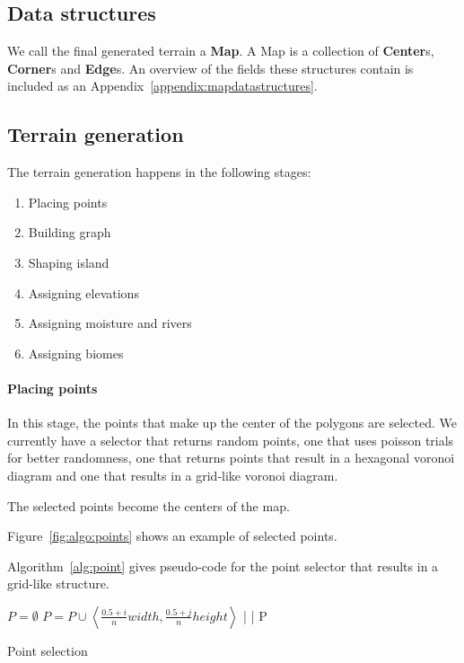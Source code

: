 
\subsection{Data structures}

We call the final generated terrain a \textbf{Map}.
A Map is a collection of \textbf{Center}s, \textbf{Corner}s and \textbf{Edge}s.
An overview of the fields these structures contain is included as an Appendix~\ref{appendix:mapdatastructures}.

\subsection{Terrain generation}

The terrain generation happens in the following stages:

\begin{enumerate}
	\item Placing points
	\item Building graph
	\item Shaping island
	\item Assigning elevations
	\item Assigning moisture and rivers
	\item Assigning biomes
\end{enumerate}

\paragraph{Placing points}

In this stage, the points that make up the center of the polygons are selected.
We currently have a selector that returns random points, one that uses poisson trials for better randomness, one that returns points that result in a hexagonal voronoi diagram and one that results in a grid-like voronoi diagram.

The selected points become the centers of the map.

Figure~\ref{fig:algo:points} shows an example of selected points.

Algorithm~\ref{alg:point} gives pseudo-code for the point selector that results in a grid-like structure.

\begin{algo*}
\begin{sourcecode}
$P = \emptyset$
		$P = P \cup \left<\frac{0.5 + i}{n} width, \frac{0.5 + j}{n} height\right>$
	|
|
\return P
\qend
\end{sourcecode}
	\caption{Point selection}
	\label{alg:point}
\end{algo*}

